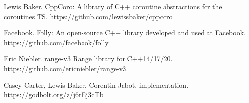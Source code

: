 \documentclass{wg21}
\begin{document}
\begin{thebibliography}{9}
    Lewis Baker.
    CppCoro: A library of C++ coroutine abstractions for the coroutines TS.
    \url{https://github.com/lewissbaker/cppcoro}

    Facebook.
    Folly: An open-source C++ library developed and used at Facebook.
    \url{https://github.com/facebook/folly}

    Eric Niebler.
    range-v3 Range library for C++14/17/20.
    \url{https://github.com/ericniebler/range-v3}

    Casey Carter, Lewis Baker, Corentin Jabot.
     implementation.
    \url{https://godbolt.org/z/j6rEj3cTb}
\end{thebibliography}
\end{document}
